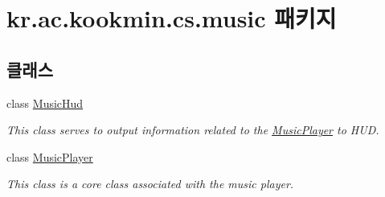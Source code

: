 \hypertarget{namespacekr_1_1ac_1_1kookmin_1_1cs_1_1music}{}\section{kr.\+ac.\+kookmin.\+cs.\+music 패키지}
\label{namespacekr_1_1ac_1_1kookmin_1_1cs_1_1music}
\subsection*{클래스}
\begin{DoxyCompactItemize}
\item 
class \hyperlink{classkr_1_1ac_1_1kookmin_1_1cs_1_1music_1_1_music_hud}{Music\+Hud}
\begin{DoxyCompactList}\small\item\em This class serves to output information related to the \hyperlink{classkr_1_1ac_1_1kookmin_1_1cs_1_1music_1_1_music_player}{Music\+Player} to H\+U\+D. \end{DoxyCompactList}\item 
class \hyperlink{classkr_1_1ac_1_1kookmin_1_1cs_1_1music_1_1_music_player}{Music\+Player}
\begin{DoxyCompactList}\small\item\em This class is a core class associated with the music player. \end{DoxyCompactList}\end{DoxyCompactItemize}
